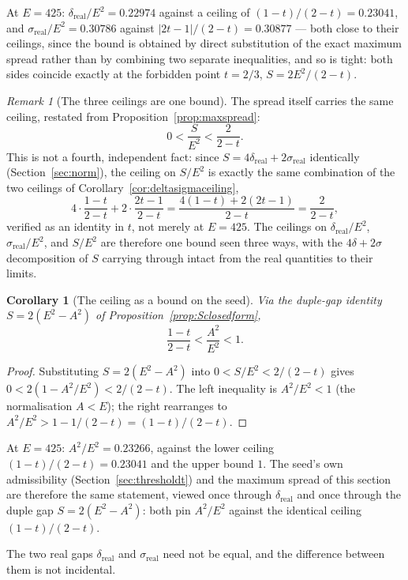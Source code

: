 \documentclass[12pt]{article}
\newtheorem{corollary}[theorem]{Corollary}
\theoremstyle{remark}
\newtheorem{remark}[theorem]{Remark}
\begin{document}
At $E=425$: $\delta_{\text{real}}/E^2 = 0.22974$ against a ceiling of
$(1-t)/(2-t)=0.23041$, and $\sigma_{\text{real}}/E^2 = 0.30786$
against $\lvert2t-1\rvert/(2-t)=0.30877$ --- both close to their
ceilings, since the bound is obtained by direct substitution of the
exact maximum spread rather than by combining two separate
inequalities, and so is tight: both sides coincide exactly at the
forbidden point $t=2/3$, $S=2E^2/(2-t)$.

\begin{remark}[The three ceilings are one bound]
The spread itself carries the same ceiling, restated from
Proposition~\ref{prop:maxspread}:
\[
0 < \frac{S}{E^2} < \frac{2}{2-t} .
\]
This is not a fourth, independent fact: since
$S=4\delta_{\text{real}}+2\sigma_{\text{real}}$ identically
(Section~\ref{sec:norm}), the ceiling on $S/E^2$ is exactly the same
combination of the two ceilings of
Corollary~\ref{cor:deltasigmaceiling},
\[
4\cdot\frac{1-t}{2-t} + 2\cdot\frac{2t-1}{2-t}
= \frac{4(1-t)+2(2t-1)}{2-t} = \frac{2}{2-t} ,
\]
verified as an identity in $t$, not merely at $E=425$. The ceilings on
$\delta_{\text{real}}/E^2$, $\sigma_{\text{real}}/E^2$, and $S/E^2$
are therefore one bound seen three ways, with the $4\delta+2\sigma$
decomposition of $S$ carrying through intact from the real quantities
to their limits.
\end{remark}

\begin{corollary}[The ceiling as a bound on the seed]\label{cor:seedceiling}
Via the duple-gap identity $S=2(E^2-A^2)$ of
Proposition~\ref{prop:Sclosedform},
\[
\frac{1-t}{2-t} < \frac{A^2}{E^2} < 1 .
\]
\end{corollary}

\begin{proof}
Substituting $S=2(E^2-A^2)$ into $0<S/E^2<2/(2-t)$ gives
$0 < 2(1-A^2/E^2) < 2/(2-t)$. The left inequality is $A^2/E^2<1$
(the normalisation $A<E$); the right rearranges to
$A^2/E^2 > 1-1/(2-t) = (1-t)/(2-t)$.
\end{proof}

At $E=425$: $A^2/E^2 = 0.23266$, against the lower ceiling
$(1-t)/(2-t) = 0.23041$ and the upper bound $1$. The seed's own
admissibility (Section~\ref{sec:thresholdt}) and the maximum spread of
this section are therefore the same statement, viewed once through
$\delta_{\text{real}}$ and once through the duple gap $S=2(E^2-A^2)$:
both pin $A^2/E^2$ against the identical ceiling $(1-t)/(2-t)$.

The two real gaps $\delta_{\text{real}}$ and $\sigma_{\text{real}}$
need not be equal, and the difference between them is not incidental.
\end{document}
